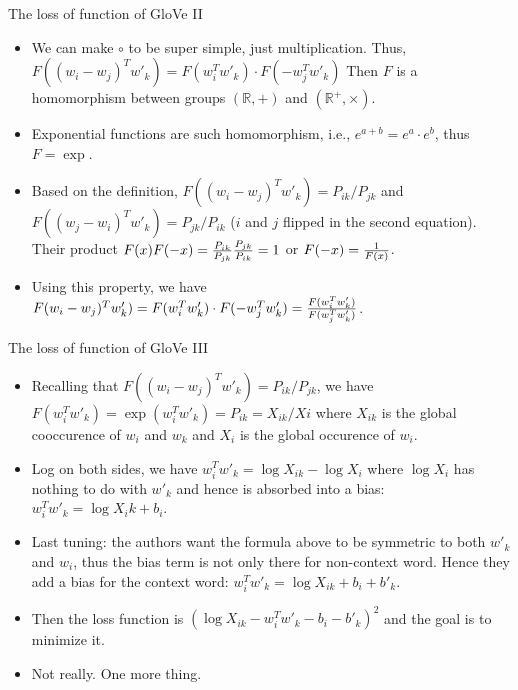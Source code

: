 \documentclass[11pt,handout]{beamer}
\begin{document}
\begin{frame}{The loss of function of GloVe II}
\begin{itemize}[<+->]
 \item We can make $\circ$ to be super simple, just multiplication. Thus, 
 $F((w_i-w_j)^T w'_k) = F(w_i^T w'_k) \cdot F(-w_j^T w'_k)$
 Then $F$ is a homomorphism between groups $(\mathbb{R}, +)$ and $(\mathbb{R}^+, \times)$.
 \item Exponential functions are such homomorphism, i.e., $e^{a+b} = e^a \cdot e^b$, thus $F=\exp$. 
 \item Based on the definition, 
 $F((w_i-w_j)^T w'_k) = P_{ik}/P_{jk}$ and $F((w_j-w_i)^T w'_k) = P_{jk}/P_{ik}$ ($i$ and $j$ flipped in the second equation). Their product $F(x)F(-x)={P_{ik}\over P_{jk}}{P_{jk}\over P_{ik}}=1$ or $F(-x)={1\over F(x)}$. 
 \item Using this property, we have  $F(w_i-w_j)^T w'_k) = F(w_i^T w'_k) \cdot F(-w_j^T w'_k) = {F(w_i^T w'_k) \over F(w_j^Tw'_k)}$. 
\end{itemize}
\end{frame}

\begin{frame}{The loss of function of GloVe III}
\begin{itemize}[<+->]
 \item Recalling that $F( (w_i-w_j)^T w'_k) = P_{ik} / P_{jk}$, we have $F(w_i^T w'_k) = \exp(w_i^T w'_k ) =  P_{ik} = X_{ik} / X{i}$ where $X_{ik}$ is the global cooccurence of $w_i$ and $w_k$ and $X_i$ is the global occurence of $w_i$. 
 \item Log on both sides, we have $w_i^T w'_k = \log X_{ik} - \log{X_i}$ where $\log{X_i}$ has nothing to do with $w'_k$ and hence is absorbed into a bias: $w_i^T w'_k = \log{X_ik} + b_i$. 
 \item Last tuning: the authors want the formula above to be symmetric to both $w'_k$ and $w_i$, thus the bias term is not only there for non-context word. Hence they add a bias for the context word: $w_i^T w'_k = \log X_{ik} + b_i + b'_k$. 
 \item Then the loss function is $(\log X_{ik} - w_i^T w'_k - b_i - b'_k)^2$ and the goal is to minimize it. 
 \item Not really. One more thing. 
\end{itemize}
\end{frame}
\end{document}
